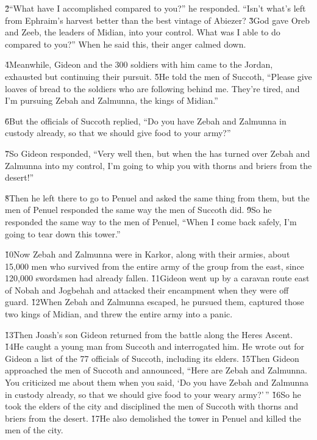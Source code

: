 \v{2}``What have I accomplished compared to you?'' he responded. ``Isn't what's left from Ephraim's harvest better than the best vintage of Abiezer? \v{3}God gave Oreb and Zeeb, the leaders of Midian, into your control. What was I able to do compared to you?'' When he said this, their anger calmed down.

\v{4}Meanwhile, Gideon and the 300 soldiers with him came to the Jordan, exhausted but continuing their pursuit. \v{5}He told the men of Succoth, ``Please give loaves of bread to the soldiers who are following behind me. They're tired, and I'm pursuing Zebah and Zalmunna, the kings of Midian.''

\v{6}But the officials of Succoth replied, ``Do you have Zebah and Zalmunna in custody already, so that we should give food to your army?''

\v{7}So Gideon responded, ``Very well then, but when the  has turned over Zebah and Zalmunna into my control, I'm going to whip you with thorns and briers from the desert!''

\v{8}Then he left there to go to Penuel and asked the same thing from them, but the men of Penuel responded the same way the men of Succoth did. \v{9}So he responded the same way to the men of Penuel, ``When I come back safely, I'm going to tear down this tower.''

\v{10}Now Zebah and Zalmunna were in Karkor, along with their armies, about 15,000 men who survived from the entire army of the group from the east, since 120,000 swordsmen had already fallen. \v{11}Gideon went up by a caravan route east of Nobah and Jogbehah and attacked their encampment when they were off guard. \v{12}When Zebah and Zalmunna escaped, he pursued them, captured those two kings of Midian, and threw the entire army into a panic.

\v{13}Then Joash's son Gideon returned from the battle along the Heres Ascent. \v{14}He caught a young man from Succoth and interrogated him. He wrote out for Gideon a list of the 77 officials of Succoth, including its elders. \v{15}Then Gideon approached the men of Succoth and announced, ``Here are Zebah and Zalmunna. You criticized me about them when you said, `Do you have Zebah and Zalmunna in custody already, so that we should give food to your weary army?'\,'' \v{16}So he took the elders of the city and disciplined the men of Succoth with thorns and briers from the desert. \v{17}He also demolished the tower in Penuel and killed the men of the city.

